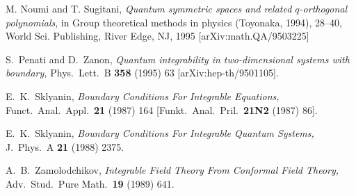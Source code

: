 \documentclass[a4paper,12pt]{article}
\numberwithin{equation}{section}
\begin{document}
{\begin{thebibliography}{99}
M. Noumi and T. Sugitani, \textit{Quantum symmetric
spaces and related $q$-orthogonal polynomials}, in Group
theoretical methods in physics (Toyonaka, 1994), 28--40, World
Sci. Publishing, River Edge, NJ, 1995 [arXiv:math.QA/9503225]

S.~Penati and D.~Zanon, \textit{Quantum integrability in
two-dimensional systems with boundary,} Phys.\ Lett.\ B {\bf 358}
(1995) 63 [arXiv:hep-th/9501105].

E.~K.~Sklyanin, \textit{Boundary Conditions For Integrable
Equations,} Funct.\ Anal.\ Appl.\  {\bf 21} (1987) 164 [Funkt.\
Anal.\ Pril.\ {\bf 21N2} (1987) 86].

E.~K.~Sklyanin, \textit{Boundary Conditions For Integrable Quantum
Systems,} J.\ Phys.\ A {\bf 21} (1988) 2375.

A.~B.~Zamolodchikov, \textit{Integrable Field Theory From
Conformal Field Theory,} Adv.\ Stud.\ Pure Math.\  {\bf 19} (1989)
641.


\end{thebibliography}
}
\end{document}
